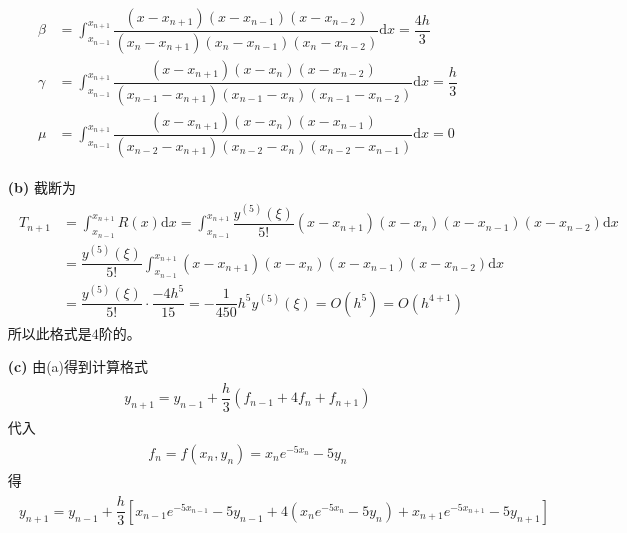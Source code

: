 \documentclass[12pt,a4paper,utf8]{ctexart}
\begin{document}
\begin{enumerate}
\begin{eqnarray}
\begin{aligned}
               \beta  & =\int_{x_{n-1}}^{x_{n+1}}\dfrac{(x-x_{n+1})(x-x_{n-1})(x-x_{n-2})}{(x_{n}-x_{n+1})(x_{n}-x_{n-1})(x_{n}-x_{n-2})}\mathrm{d}x=\dfrac{4h}{3}  \\
               \gamma & =\int_{x_{n-1}}^{x_{n+1}}\dfrac{(x-x_{n+1})(x-x_{n})(x-x_{n-2})}{(x_{n-1}-x_{n+1})(x_{n-1}-x_{n})(x_{n-1}-x_{n-2})}\mathrm{d}x=\dfrac{h}{3} \\
               \mu    & =\int_{x_{n-1}}^{x_{n+1}}\dfrac{(x-x_{n+1})(x-x_{n})(x-x_{n-1})}{(x_{n-2}-x_{n+1})(x_{n-2}-x_{n})(x_{n-2}-x_{n-1})}\mathrm{d}x=0
               \nonumber
            \end{aligned}
         \end{eqnarray}
   \item[\textbf{(b)}]截断为
         \begin{eqnarray}
            \begin{aligned}
               T_{n+1}&=\int_{x_{n-1}}^{x_{n+1}}R(x)\mathrm{d}x
               =\int_{x_{n-1}}^{x_{n+1}}\dfrac{y^{(5)}(\xi )}{5!}(x-x_{n+1})(x-x_{n})(x-x_{n-1})(x-x_{n-2})\mathrm{d}x\\
               &=\dfrac{y^{(5)}(\xi )}{5!}\int_{x_{n-1}}^{x_{n+1}}(x-x_{n+1})(x-x_{n})(x-x_{n-1})(x-x_{n-2})\mathrm{d}x\\
               &=\dfrac{y^{(5)}(\xi )}{5!}\cdot \dfrac{-4h^5}{15}=-\dfrac{1}{450}h^5y^{(5)}(\xi )=O(h^{5})=O(h^{4+1})
               \nonumber
            \end{aligned}
         \end{eqnarray}
         所以此格式是$4$阶的。
   \item[\textbf{(c)}]由(a)得到计算格式
   \begin{eqnarray}
      \begin{aligned}
         y_{n+1}=y_{n-1}+\dfrac{h}{3}(f_{n-1}+4f_{n}+f_{n+1})
         \nonumber
      \end{aligned}
   \end{eqnarray}
   代入
   \begin{eqnarray}
      \begin{aligned}
         f_n=f(x_n,y_n)=x_{n}e^{-5x_{n}}-5y_{n}
         \nonumber
      \end{aligned}
   \end{eqnarray}
   得
   \begin{eqnarray}
      \begin{aligned}
         y_{n+1}=y_{n-1}+\dfrac{h}{3}[x_{n-1}e^{-5x_{n-1}}-5y_{n-1}+4(x_{n}e^{-5x_{n}}-5y_{n})+x_{n+1}e^{-5x_{n+1}}-5y_{n+1}]
         \nonumber

\end{aligned}
\end{eqnarray}
\end{enumerate}
\end{document}
